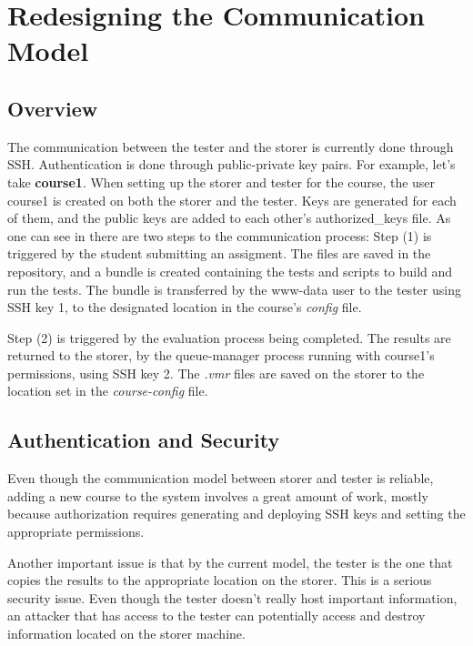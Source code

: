 \chapter{Redesigning the Communication Model}
\label{chapter:virt-comm-model}

\section{Overview}
\label{sec:vmc-overview}

The communication between the tester and the storer is currently done
through SSH. Authentication is done through public-private key pairs.
For example, let's take \textbf{course1}. When setting up the storer
and tester for the course, the user course1 is created on both the
storer and the tester. Keys are generated for each of them, and
the public keys are added to each other's authorized_keys file.
As one can see in  there are two 
steps to the communication process: Step (1) is triggered by the student
submitting an assigment. The files are saved in the repository, and a bundle
is created containing the tests and scripts to build and run the tests.
The bundle is transferred by the www-data user to the tester using SSH key 1, 
to the designated location in the course's \textit{config} file.

Step (2) is triggered by the evaluation process being completed. 
The results are returned to the storer, by the queue-manager 
process running with course1's permissions, using SSH key 2. 
The \textit{.vmr} files are saved on the storer to the location 
set in the \textit{course-config} file.

\begin{center}
\end{center}

\section{Authentication and Security}
\label{sec:vmc-auth}

Even though the communication model between storer and tester is reliable,
adding a new course to the system involves a great amount of work, mostly 
because authorization requires generating and deploying SSH keys and setting
the appropriate permissions.

Another important issue is that by the current model, the tester is the one 
that copies the results to the appropriate location on the storer. This is 
a serious security issue. Even though the tester doesn't really host important
information, an attacker that has access to the tester can potentially access 
and destroy information located on the storer machine.

